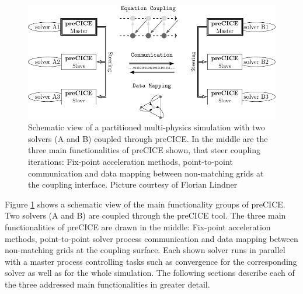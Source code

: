   \begin{figure}[htbp]
  	\centering
  	\includegraphics[width=0.97\linewidth]{figures/NewCommunicationScheme}
  	\caption{Schematic view of a partitioned multi-physics simulation with two solvers (A and B) coupled through preCICE. In the middle are the three main functionalities of preCICE shown, that steer coupling iterations: Fix-point acceleration methods, point-to-point communication and data mapping between non-matching grids at the coupling interface. Picture courtesy of Florian Lindner \cite{bungartz2015fully} }
  	\label{fig:precice}
  \end{figure}
  
  Figure \ref{fig:precice} shows a schematic view of the main functionality groups of preCICE. Two solvers (A and B) are coupled through the preCICE tool. The three main functionalities of preCICE are drawn in the middle: Fix-point acceleration methods, point-to-point solver process communication and data mapping between non-matching grids at the coupling surface. Each shown solver runs in parallel with a master process controlling tasks such as convergence for the corresponding solver as well as for the whole simulation. The following sections describe each of the three addressed main functionalities in greater detail.
  
 
